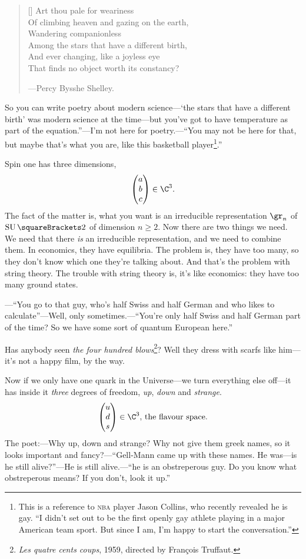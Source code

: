 \documentclass[10pt, a4paper, twoside]{lecturenotes}
\begin{document}
\begin{lecture}[date=2013-04-30, official=true]
\begin{verse}[\versewidth]
Art thou pale for weariness \\
Of climbing heaven and gazing on the earth,\\
Wandering companionless\\
Among the stars that have a different birth,\\
And ever changing, like a joyless eye\\
That finds no object worth its constancy?
\begin{flushright}
---Percy Bysshe Shelley.
\end{flushright}
\end{verse}
So you can write poetry about modern science---`the stars that have a different birth' was modern science at the time---but you've got to have temperature as part of the equation.''---I'm not here for poetry.---``You may not be here for that, but maybe that's what you are, like this basketball player\footnote{This is a reference to \textsc{nba} player Jason Collins, who recently revealed he is gay. ``I didn't set out to be the first openly gay athlete playing in a major American team sport. But since I am, I'm happy to start the conversation.''}.''

Spin one has three dimensions,\[
\begin{pmatrix}
a\\ b\\ c
\end{pmatrix}\in\C^3\text.
\] The fact of the matter is, what you want is an irreducible representation $\gr_n$ of $\SpecialUnitaryGroup\of 2$ of dimension $n\geq 2$. Now there are two things we need. We need that there \emph{is} an irreducible representation, and we need to combine them. In economics, they have equilibria. The problem is, they have too many, so they don't know which one they're talking about. And that's the problem with string theory. The trouble with string theory is, it's like economics: they have too many ground states.

---``You go to that guy, who's half Swiss and half German and who likes to calculate''---Well, only sometimes.---``You're only half Swiss and half German part of the time? So we have some sort of quantum European here.'' 

Has anybody seen \emph{the four hundred blows}\footnote{\emph{Les quatre cents coups}, 1959, directed by François Truffaut.}? Well they dress with scarfs like him---it's not a happy film, by the way.

Now if we only have one quark in the Universe---we turn everything else off---it has inside it \emph{three} degrees of freedom, \emph{up}, \emph{down} and \emph{strange}.
\[
\begin{pmatrix}
u\\ d\\ s
\end{pmatrix}\in \C^3 \text{, the flavour space.}
\]
The poet:---Why up, down and strange? Why not give them greek names, so it looks important and fancy?---``Gell-Mann came up with these names. He was---is he still alive?''---He is still alive.---``he is an obstreperous guy. Do you know what obstreperous means? If you don't, look it up.'' 


\end{lecture}
\end{document}
